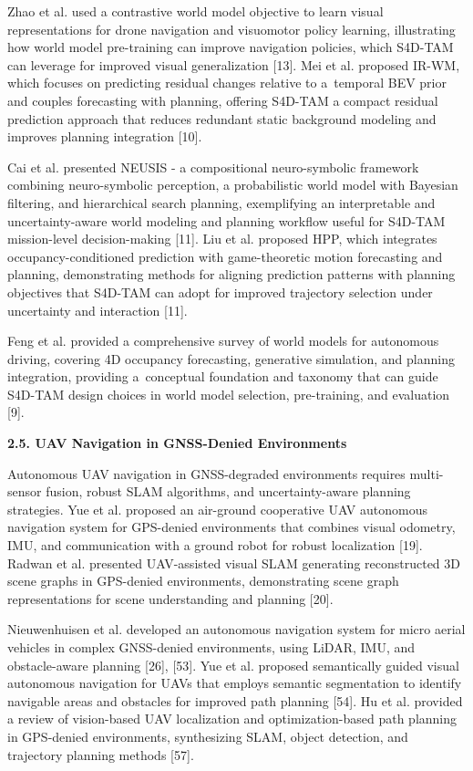 \documentclass[
]{article}
\begin{document}
Zhao et al. used a contrastive world model objective to learn visual
representations for drone navigation and visuomotor policy learning,
illustrating how world model pre-training can improve navigation
policies, which S4D-TAM can leverage for improved visual generalization
{[}13{]}. Mei et al. proposed IR-WM, which focuses on predicting
residual changes relative to a~temporal BEV prior and couples
forecasting with planning, offering S4D-TAM a compact residual
prediction approach that reduces redundant static background modeling
and improves planning integration {[}10{]}.

Cai et al. presented NEUSIS - a compositional neuro-symbolic framework
combining neuro-symbolic perception, a probabilistic world model with
Bayesian filtering, and hierarchical search planning, exemplifying an
interpretable and uncertainty-aware world modeling and planning workflow
useful for S4D-TAM mission-level decision-making {[}11{]}. Liu et al.
proposed HPP, which integrates occupancy-conditioned prediction with
game-theoretic motion forecasting and planning, demonstrating methods
for aligning prediction patterns with planning objectives that S4D-TAM
can adopt for improved trajectory selection under uncertainty and
interaction {[}11{]}.

Feng et al. provided a comprehensive survey of world models for
autonomous driving, covering 4D occupancy forecasting, generative
simulation, and planning integration, providing a~conceptual foundation
and taxonomy that can guide S4D-TAM design choices in world model
selection, pre-training, and evaluation {[}9{]}.

\textbf{2.5. UAV Navigation in GNSS-Denied Environments}

Autonomous UAV navigation in GNSS-degraded environments requires
multi-sensor fusion, robust SLAM algorithms, and uncertainty-aware
planning strategies. Yue et al. proposed an air-ground cooperative UAV
autonomous navigation system for GPS-denied environments that combines
visual odometry, IMU, and communication with a ground robot for robust
localization {[}19{]}. Radwan et al. presented UAV-assisted visual SLAM
generating reconstructed 3D scene graphs in GPS-denied environments,
demonstrating scene graph representations for scene understanding and
planning {[}20{]}.

Nieuwenhuisen et al. developed an autonomous navigation system for micro
aerial vehicles in complex GNSS-denied environments, using LiDAR, IMU,
and obstacle-aware planning {[}26{]}, {[}53{]}. Yue et al. proposed
semantically guided visual autonomous navigation for UAVs that employs
semantic segmentation to identify navigable areas and obstacles for
improved path planning {[}54{]}. Hu et al. provided a review of
vision-based UAV localization and optimization-based path planning in
GPS-denied environments, synthesizing SLAM, object detection, and
trajectory planning methods {[}57{]}.
\end{document}
